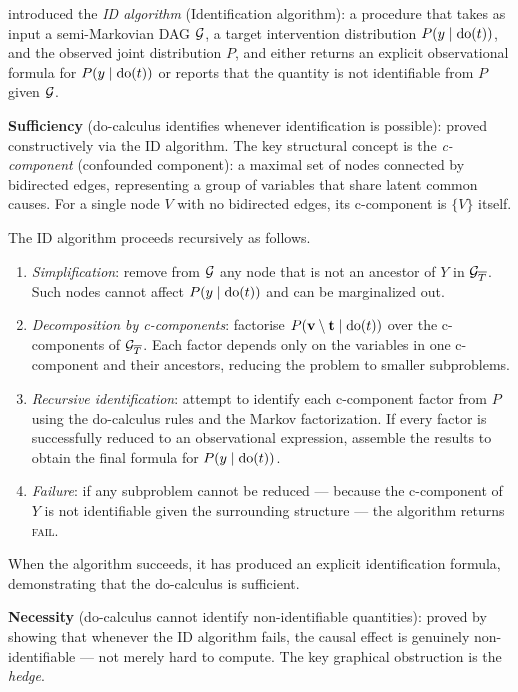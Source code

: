 \documentclass[master.tex]{subfiles}
\begin{document}
\begin{tcolorbox}[defstyle, title={Proof Sketch and the ID Algorithm}]
\citet{shpitser2006identification} introduced the \emph{ID algorithm}
(Identification algorithm): a procedure that takes as input a
semi-Markovian DAG $\mathcal{G}$, a target intervention distribution
$P(y \mid \mathrm{do}(t))$, and the observed joint distribution $P$, and either
returns an explicit observational formula for $P(y \mid \mathrm{do}(t))$ or
reports that the quantity is not identifiable from $P$ given $\mathcal{G}$.

\textbf{Sufficiency} (do-calculus identifies whenever identification is
possible): proved constructively via the ID algorithm.  The key structural
concept is the \emph{c-component} (confounded component): a maximal set of
nodes connected by bidirected edges, representing a group of variables that
share latent common causes.  For a single node $V$ with no bidirected
edges, its c-component is $\{V\}$ itself.

The ID algorithm proceeds recursively as follows.
\begin{enumerate}
  \item \textit{Simplification}: remove from $\mathcal{G}$ any node that is not
        an ancestor of $Y$ in $\mathcal{G}_{\overline{T}}$.  Such nodes cannot
        affect $P(y \mid \mathrm{do}(t))$ and can be marginalized out.
  \item \textit{Decomposition by c-components}: factorise
        $P(\mathbf{v} \setminus \mathbf{t} \mid \mathrm{do}(t))$ over the
        c-components of $\mathcal{G}_{\overline{T}}$.  Each factor depends only
        on the variables in one c-component and their ancestors, reducing
        the problem to smaller subproblems.
  \item \textit{Recursive identification}: attempt to identify each
        c-component factor from $P$ using the do-calculus rules and the
        Markov factorization.  If every factor is successfully reduced to
        an observational expression, assemble the results to obtain the
        final formula for $P(y \mid \mathrm{do}(t))$.
  \item \textit{Failure}: if any subproblem cannot be reduced --- because
        the c-component of $Y$ is not identifiable given the surrounding
        structure --- the algorithm returns \textsc{fail}.
\end{enumerate}
When the algorithm succeeds, it has produced an explicit identification
formula, demonstrating that the do-calculus is sufficient.

\textbf{Necessity} (do-calculus cannot identify non-identifiable
quantities): proved by showing that whenever the ID algorithm fails, the
causal effect is genuinely non-identifiable --- not merely hard to compute.
The key graphical obstruction is the \emph{hedge}.


\end{tcolorbox}
\end{document}
